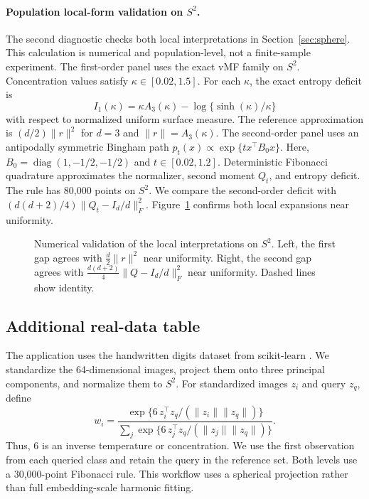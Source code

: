 \documentclass[twoside]{article}
\theoremstyle{definition}
\theoremstyle{remark}
\begin{document}
\paragraph{Population local-form validation on $S^2$.}
The second diagnostic checks both local interpretations in Section~\ref{sec:sphere}. This calculation is numerical and population-level, not a finite-sample experiment. The first-order panel uses the exact vMF family on $S^2$. Concentration values satisfy $\kappa\in[0.02,1.5]$. For each $\kappa$, the exact entropy deficit is
\[
  I_1(\kappa)=\kappa A_3(\kappa)-\log\{\sinh(\kappa)/\kappa\}
\]
with respect to normalized uniform surface measure. The reference approximation is $(d/2)\|r\|^2$ for $d=3$ and $\|r\|=A_3(\kappa)$. The second-order panel uses an antipodally symmetric Bingham path $p_t(x)\propto\exp\{t x^\top B_0x\}$. Here, $B_0=\operatorname{diag}(1,-1/2,-1/2)$ and $t\in[0.02,1.2]$. Deterministic Fibonacci quadrature approximates the normalizer, second moment $Q_t$, and entropy deficit. The rule has 80,000 points on $S^2$. We compare the second-order deficit with $(d(d+2)/4)\|Q_t-I_d/d\|_F^2$. Figure~\ref{fig:local_forms} confirms both local expansions near uniformity.

\begin{figure}[ht]
\centering

\caption{Numerical validation of the local interpretations on $S^2$. Left, the first gap agrees with $\frac d2\|r\|^2$ near uniformity. Right, the second gap agrees with $\frac{d(d+2)}4\|Q-I_d/d\|_F^2$ near uniformity. Dashed lines show identity.}
\label{fig:local_forms}
\end{figure}




\subsection{Additional real-data table}
\label{app:digits_table}

The application uses the handwritten digits dataset from \textsf{scikit-learn} \citep{pedregosa_2011_ScikitlearnMachineLearning}. We standardize the 64-dimensional images, project them onto three principal components, and normalize them to $S^2$. For standardized images $z_i$ and query $z_q$, define
\[
 w_i=\frac{\exp\{6\,z_i^\top z_q/(\|z_i\|\|z_q\|)\}}
 {\sum_j\exp\{6\,z_j^\top z_q/(\|z_j\|\|z_q\|)\}}.
\]
Thus, 6 is an inverse temperature or concentration. We use the first observation from each queried class and retain the query in the reference set. Both levels use a 30,000-point Fibonacci rule. This workflow uses a spherical projection rather than full embedding-scale harmonic fitting.
\end{document}
